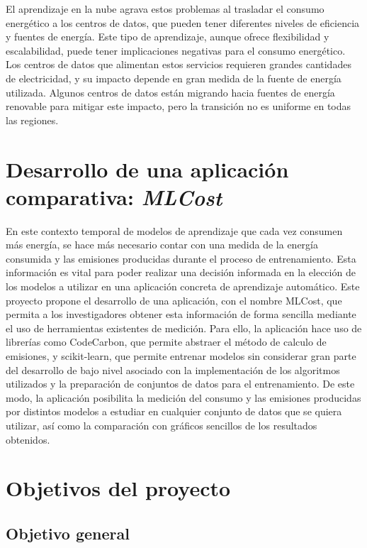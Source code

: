 El aprendizaje en la nube agrava estos problemas al trasladar el consumo energético a los centros de datos, que pueden tener diferentes niveles de eficiencia y fuentes de energía. Este tipo de aprendizaje, aunque ofrece flexibilidad y escalabilidad, puede tener implicaciones negativas para el consumo energético. Los centros de datos que alimentan estos servicios requieren grandes cantidades de electricidad, y su impacto depende en gran medida de la fuente de energía utilizada. Algunos centros de datos están migrando hacia fuentes de energía renovable para mitigar este impacto, pero la transición no es uniforme en todas las regiones.


\section{Desarrollo de una aplicación comparativa: \emph{MLCost}}

En este contexto temporal de modelos de aprendizaje que cada vez consumen más energía, se hace más necesario contar con una medida de la energía consumida y las emisiones producidas durante el proceso de entrenamiento. Esta información es vital para poder realizar una decisión informada en la elección de los modelos a utilizar en una aplicación concreta de aprendizaje automático. Este proyecto propone el desarrollo de una aplicación, con el nombre MLCost, que permita a los investigadores obtener esta información de forma sencilla mediante el uso de herramientas existentes de medición. Para ello, la aplicación hace uso de librerías como CodeCarbon, que permite abstraer el método de calculo de emisiones, y scikit-learn, que permite entrenar modelos sin considerar gran parte del desarrollo de bajo nivel asociado con la implementación de los algoritmos utilizados y la preparación de conjuntos de datos para el entrenamiento. De este modo, la aplicación posibilita la medición del consumo y las emisiones producidas por distintos modelos a estudiar en cualquier conjunto de datos que se quiera utilizar, así como la comparación con gráficos sencillos de los resultados obtenidos.


\section{Objetivos del proyecto}
\label{sec:objetivos}

\subsection{Objetivo general}
\label{sec:objetivo-general}


